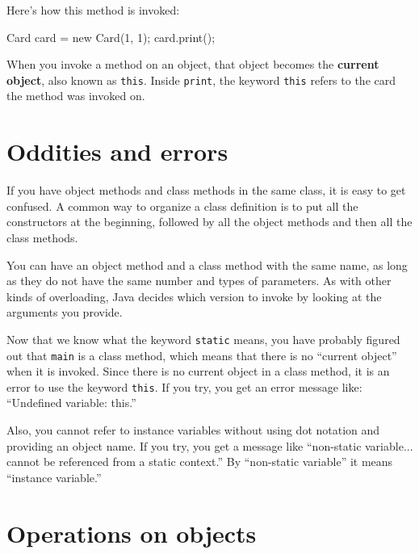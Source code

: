 Here's how this method is invoked:

\begin{code}
    Card card = new Card(1, 1);
    card.print();
\end{code}

When you invoke a method on an object, that object becomes the {\bf
current object}, also known as {\tt this}.  Inside {\tt print},
the keyword {\tt this} refers to the card the method was invoked on.


\section{Oddities and errors}


If you have object methods and class methods in the same class, it is
easy to get confused.  A common way to organize a class definition is
to put all the constructors at the beginning, followed by all the
object methods and then all the class methods.

You can have an object method and a class method with the same
name, as long as they do not have the same number and types of
parameters.  As with other kinds of overloading, Java decides
which version to invoke by looking at the arguments you provide.

Now that we know what the keyword {\tt static} means, you
have probably figured out that {\tt main} is a class method,
which means that there is no ``current object'' when it is invoked.
%
Since there is no current object in a class method, it is an
error to use the keyword {\tt this}.  If you try, you get
an error message like: ``Undefined variable: this.''

Also, you cannot refer to instance variables without using dot
notation and providing an object name.  If you try, you get a message
like ``non-static variable... cannot be referenced from a static
context.''  By ``non-static variable'' it means ``instance variable.''


\section{Operations on objects}
\label{objectops}

